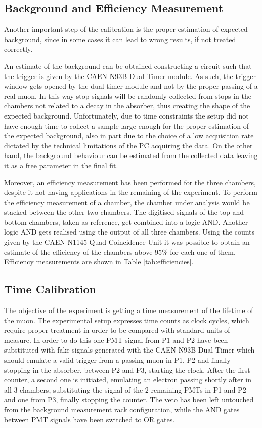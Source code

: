 \documentclass[../main.tex]{subfiles}
\begin{document}
\subsection{Background and Efficiency Measurement} \label{subsec:bkg}
Another important step of the calibration is the proper estimation of expected background, since in some cases it can lead to wrong results, if not treated correctly.

An estimate of the background can be obtained constructing a circuit such that the trigger is given by the CAEN N93B Dual Timer module. As such, the trigger window gets opened by the dual timer module and not by the proper passing of a real muon. In this way stop signals will be randomly collected from stops in the chambers not related to a decay in the absorber, thus creating the shape of the expected background. Unfortunately, due to time constraints the setup did not have enough time to collect a sample large enough for the proper estimation of the expected background, also in part due to the choice of a low acquisition rate dictated by the technical limitations of the PC acquiring the data. On the other hand, the background behaviour can be estimated from the collected data leaving it as a free parameter in the final fit.

Moreover, an efficiency measurement has been performed for the three chambers, despite it not having applications in the remaining of the experiment. To perform the efficiency measurement of a chamber, the chamber under analysis would be stacked between the other two chambers. The digitised signals of the top and bottom chambers, taken as reference, get combined into a logic AND. Another logic AND gets realised using the output of all three chambers. Using the counts given by the CAEN N1145 Quad Coincidence Unit it was possible to obtain an estimate of the efficiency of the chambers above 95\% for each one of them. Efficiency measurements are shown in Table \ref{tab:efficiencies}.

\subsection{Time Calibration}
The objective of the experiment is getting a time measurement of the lifetime of the muon. The experimental setup expresses time counts as clock cycles, which require proper treatment in order to be compared with standard units of measure. In order to do this one PMT signal from P1 and P2 have been substituted with fake signals generated with the CAEN N93B Dual Timer which should emulate a valid trigger from a passing muon in P1, P2 and finally stopping in the absorber, between P2 and P3, starting the clock. After the first counter, a second one is initiated, emulating an electron passing shortly after in all 3 chambers, substituting the signal of the 2 remaining PMTs in P1 and P2 and one from P3, finally stopping the counter. The veto has been left untouched from the background measurement rack configuration, while the AND gates between PMT signals have been switched to OR gates. 
\end{document}
